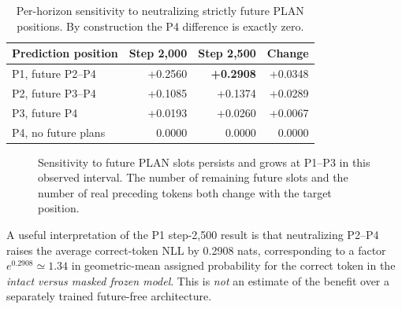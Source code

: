 \documentclass[11pt,letterpaper]{article}
\begin{document}
\begin{table}[ht]
\centering
\caption{Per-horizon sensitivity to neutralizing strictly future PLAN positions. By construction the P4 difference is exactly zero.}
\label{tab:future}
\begin{tabular}{@{}lrrr@{}}\toprule
Prediction position & Step 2,000 & Step 2,500 & Change\\\midrule
P1, future P2--P4 & +0.2560 & \textbf{+0.2908} & +0.0348\\
P2, future P3--P4 & +0.1085 & +0.1374 & +0.0289\\
P3, future P4 & +0.0193 & +0.0260 & +0.0067\\
P4, no future plans & 0.0000 & 0.0000 & 0.0000\\\bottomrule
\end{tabular}
\end{table}

\begin{figure}[ht]
\centering
{}
\caption{Sensitivity to future PLAN slots persists and grows at P1--P3 in this observed interval. The number of remaining future slots and the number of real preceding tokens both change with the target position.}
\label{fig:future}
\end{figure}

A useful interpretation of the P1 step-2,500 result is that neutralizing P2--P4 raises the average correct-token NLL by 0.2908 nats, corresponding to a factor $e^{0.2908}\simeq1.34$ in geometric-mean assigned probability for the correct token in the \emph{intact versus masked frozen model}. This is \emph{not} an estimate of the benefit over a separately trained future-free architecture.
\end{document}
